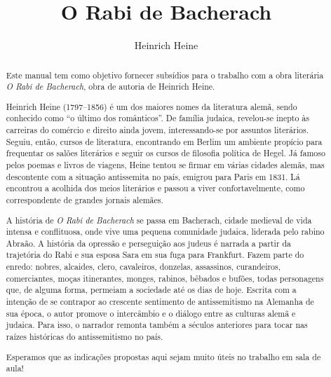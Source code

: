 \documentclass[12pt]{extarticle}
\begin{document}
\newcommand{\AutorLivro}{Heinrich Heine}
\newcommand{\TituloLivro}{O Rabi de Bacherach}
\newcommand{\Tema}{Ficção, mistério e fantasia}
\newcommand{\Genero}{Romance}
\newcommand{\imagemCapa}{./images/PNLD0018-01.png}
\newcommand{\issnppub}{---}
\newcommand{\issnepub}{---}
\newcommand{\colaborador}{{Michelle Etienne Florence, Bruno Gradella e Vicente Castro}}


\title{\TituloLivro}
\author{\AutorLivro}
\def\authornotes{\colaborador}

\date{}
\maketitle

\baselineskip\par

\begin{abstract}

Este manual tem como objetivo fornecer subsídios para o trabalho com a
obra literária \emph{O Rabi de Bacherach}, obra de autoria de Heinrich
Heine.

Heinrich Heine (1797--1856) é um dos maiores nomes da literatura alemã,
sendo conhecido como ``o último dos românticos''.
De família judaica, revelou-se inepto às carreiras do comércio e direito ainda 
jovem, interessando-se por assuntos literários. Seguiu, então, cursos de 
literatura, encontrando em Berlim um ambiente propício para frequentar os salões 
literários e seguir os cursos de filosofia política de Hegel.
Já famoso pelos poemas e livros de viagens, Heine tentou se firmar em várias
cidades alemãs, mas descontente com a situação antissemita no país, emigrou
para Paris em 1831. Lá encontrou a acolhida dos meios literários e passou a
viver confortavelmente, como correspondente de grandes jornais alemães.

A história de \textit{O Rabi de Bacherach} se passa em Bacherach, cidade medieval 
de vida intensa e conflituosa, onde vive uma pequena comunidade judaica, liderada pelo
rabino Abraão. A história da opressão e perseguição aos judeus é narrada a
partir da trajetória do Rabi e sua esposa Sara em sua fuga para Frankfurt.
Fazem parte do enredo: nobres, alcaides, clero, cavaleiros, donzelas, assassinos, 
curandeiros, comerciantes, moças itinerantes, monges, rabinos, bêbados e bufões, 
todas personagens que, de alguma forma, permeiam a sociedade até os dias de hoje.
Escrita com a intenção de se contrapor ao crescente sentimento de antissemitismo
na Alemanha de sua época, o autor promove o intercâmbio e o diálogo entre as culturas 
alemã e judaica. Para isso, o narrador remonta também a séculos anteriores para tocar 
nas raízes históricas do antissemitismo no país.

Esperamos que as indicações propostas aqui sejam muito úteis no trabalho em
sala de aula! 


\end{abstract}
\end{document}
